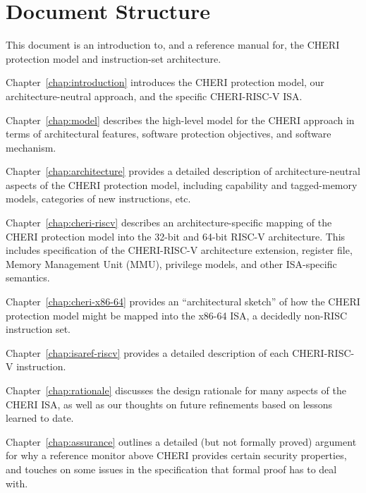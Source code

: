 \section{Document Structure}

This document is an introduction to, and a reference manual for, the CHERI
protection model and instruction-set architecture.

\medskip
\noindent
Chapter~\ref{chap:introduction} introduces the CHERI protection model, our
architecture-neutral approach, and the specific CHERI-RISC-V ISA.

\medskip
\noindent
Chapter~\ref{chap:model} describes the high-level model for the CHERI approach
in terms of architectural features, software protection objectives, and
software mechanism.

\medskip
\noindent
Chapter~\ref{chap:architecture} provides a detailed description of
architecture-neutral aspects of the CHERI protection model, including
capability and tagged-memory models, categories of new instructions, etc.

\medskip
\noindent
Chapter~\ref{chap:cheri-riscv} describes an architecture-specific mapping
of the CHERI protection model into the 32-bit and 64-bit RISC-V architecture.
This includes specification of the CHERI-RISC-V architecture extension,
register file, Memory Management Unit (MMU), privilege models, and other
ISA-specific semantics.

\medskip
\noindent
Chapter~\ref{chap:cheri-x86-64} provides an ``architectural sketch'' of how
the CHERI protection model might be mapped into the x86-64 ISA, a decidedly
non-RISC instruction set.

\medskip
\noindent
Chapter~\ref{chap:isaref-riscv} provides a detailed description of each
CHERI-RISC-V instruction.

\medskip
\noindent
Chapter~\ref{chap:rationale} discusses the design rationale for many aspects
of the CHERI ISA, as well as our thoughts on future refinements based on
lessons learned to date.

\medskip
\noindent
Chapter~\ref{chap:assurance} outlines a detailed (but not formally
proved) argument for
why a reference monitor above CHERI provides certain security
properties, and touches on some issues in the specification that
formal proof has to deal with.

